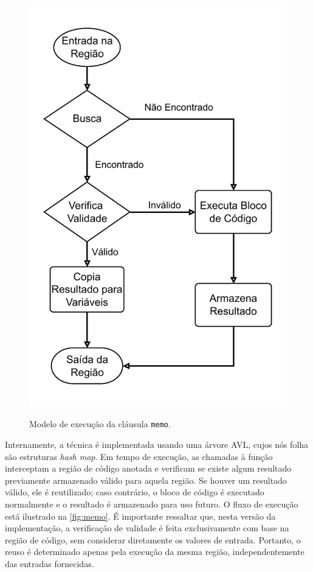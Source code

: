 \begin{figure}[htb]
    \caption{Modelo de execução da cláusula \texttt{memo}.}
    \centering
    \includegraphics[scale=0.5]{figuras/memo.pdf}
    \label{fig:memo}
    \fonte{}
\end{figure}

Internamente, a técnica é implementada usando uma árvore AVL, cujos nós folha são estruturas \textit{hash map}. Em tempo de execução, as chamadas à função interceptam a região de código anotada e verificam se existe algum resultado previamente armazenado válido para aquela região. Se houver um resultado válido, ele é reutilizado; caso contrário, o bloco de código é executado normalmente e o resultado é armazenado para uso futuro. O fluxo de execução está ilustrado na \autoref{fig:memo}. É importante ressaltar que, nesta versão da implementação, a verificação de validade é feita exclusivamente com base na região de código, sem considerar diretamente os valores de entrada. Portanto, o reuso é determinado apenas pela execução da mesma região, independentemente das entradas fornecidas.

